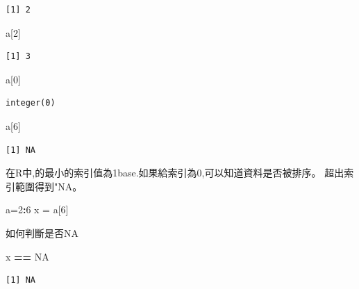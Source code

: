 \documentclass[]{book}
\newenvironment{Shaded}{\begin{snugshade}}{\end{snugshade}}
\newcommand{\DecValTok}[1]{\textcolor[rgb]{0.00,0.00,0.81}{#1}}
\newcommand{\NormalTok}[1]{#1}
\newcommand{\OperatorTok}[1]{\textcolor[rgb]{0.81,0.36,0.00}{\textbf{#1}}}
\newcommand{\OtherTok}[1]{\textcolor[rgb]{0.56,0.35,0.01}{#1}}
\newcommand{\StringTok}[1]{\textcolor[rgb]{0.31,0.60,0.02}{#1}}
\theoremstyle{definition}
\theoremstyle{definition}
\theoremstyle{definition}
\theoremstyle{remark}
\begin{document}
\begin{verbatim}
[1] 2
\end{verbatim}

\begin{Shaded}
\begin{Highlighting}[]
\NormalTok{a[}\DecValTok{2}\NormalTok{]}
\end{Highlighting}
\end{Shaded}

\begin{verbatim}
[1] 3
\end{verbatim}

\begin{Shaded}
\begin{Highlighting}[]
\NormalTok{a[}\DecValTok{0}\NormalTok{]}
\end{Highlighting}
\end{Shaded}

\begin{verbatim}
integer(0)
\end{verbatim}

\begin{Shaded}
\begin{Highlighting}[]
\NormalTok{a[}\DecValTok{6}\NormalTok{]}
\end{Highlighting}
\end{Shaded}

\begin{verbatim}
[1] NA
\end{verbatim}

在R中,的最小的索引值為1base.如果給索引為0,可以知道資料是否被排序。
超出索引範圍得到"NA。

\begin{Shaded}
\begin{Highlighting}[]
\NormalTok{a=}\DecValTok{2}\OperatorTok{:}\DecValTok{6}
\NormalTok{x =}\StringTok{ }\NormalTok{a[}\DecValTok{6}\NormalTok{]}
\end{Highlighting}
\end{Shaded}

如何判斷是否NA

\begin{Shaded}
\begin{Highlighting}[]
\NormalTok{x }\OperatorTok{==}\StringTok{ }\OtherTok{NA}
\end{Highlighting}
\end{Shaded}

\begin{verbatim}
[1] NA
\end{verbatim}
\end{document}
